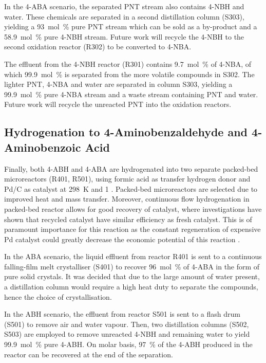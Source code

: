 In the 4-ABA scenario, the separated PNT stream also contains 4-NBH and water. These chemicals are separated in a second distillation column (S303), yielding a \SI{93}{mol\percent} pure PNT stream which can be sold as a by-product and a \SI{58.9}{mol\percent} pure 4-NBH stream. Future work will recycle the 4-NBH to the second oxidation reactor (R302) to be converted to 4-NBA.

The effluent from the 4-NBH reactor (R301) contains \SI{9.7}{mol\percent} of 4-NBA, of which \SI{99.9}{mol\percent} is separated from the more volatile compounds in S302. The lighter PNT, 4-NBA and water are separated in column S303, yielding a \SI{99.9}{mol\percent} pure 4-NBA stream and a waste stream containing PNT and water. Future work will recycle the unreacted PNT into the oxidation reactors.

\subsection{Hydrogenation to 4-Aminobenzaldehyde and 4-Aminobenzoic Acid}

Finally, both 4-ABH and 4-ABA are hydrogenated into two separate packed-bed microreactors (R401, R501), using formic acid as transfer hydrogen donor and Pd/C as catalyst at \SI{298}{\K} and \SI{1}{\atm} . Packed-bed microreactors are selected due to improved heat and mass transfer. Moreover, continuous flow hydrogenation in packed-bed reactor allows for good recovery of catalyst, where investigations have shown that recycled catalyst have similar efficiency as fresh catalyst\cite{rahman_fast_2020}. This is of paramount importance for this reaction as the constant regeneration of expensive Pd catalyst could greatly decrease the economic potential of this reaction \cite{rahman_fast_2020}. 


In the ABA scenario, the liquid effluent from reactor R401 is sent to a continuous falling-film melt crystalliser (S401) to recover \SI{96}{mol\percent} of 4-ABA in the form of pure solid crystals. It was decided that due to the large amount of water present, a distillation column would require a high heat duty to separate the compounds, hence the choice of crystallisation. %

 In the ABH scenario, the effluent from reactor S501 is sent to a flash drum (S501) to remove air and water vapour. Then, two distillation columns (S502, S503) are employed to remove unreacted 4-NBH and remaining water to yield  \SI{99.9}{mol\percent} pure 4-ABH. On molar basis, \SI{97}{\percent} of the 4-ABH produced in the reactor can be recovered at the end of the separation.

